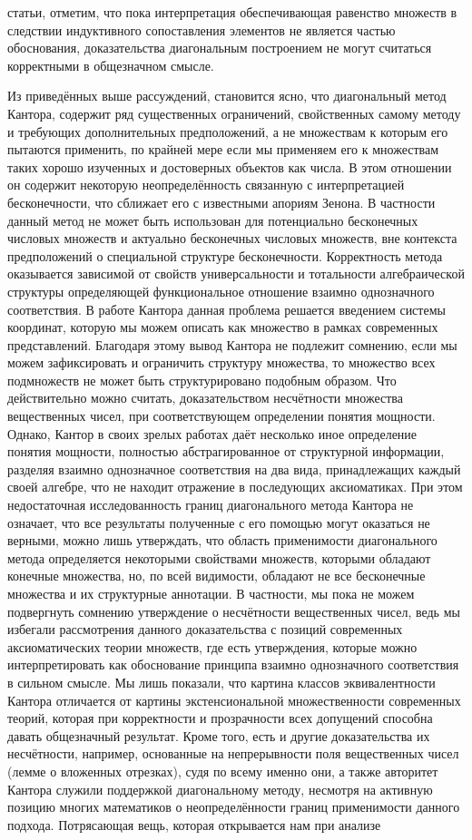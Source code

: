 \documentclass[12pt]{article}
\begin{document}
статьи, отметим, что пока интерпретация обеспечивающая равенство множеств в следствии индуктивного сопоставления элементов не является частью обоснования, доказательства диагональным построением не могут считаться корректными в общезначном смысле.

Из приведённых выше рассуждений, становится ясно, что диагональный метод Кантора, содержит ряд существенных ограничений, свойственных самому методу и требующих дополнительных предположений, а не множествам к которым его пытаются применить, по крайней мере если мы применяем его к множествам таких хорошо изученных и достоверных объектов как числа. В этом отношении он содержит некоторую неопределённость связанную с интерпретацией бесконечности, что сближает его с известными апориям Зенона. В частности данный метод не может быть использован для потенциально бесконечных числовых множеств и актуально бесконечных числовых множеств, вне контекста предположений о специальной структуре бесконечности. Корректность метода оказывается зависимой от свойств универсальности и тотальности алгебраической структуры определяющей функциональное отношение взаимно однозначного соответствия. В работе Кантора данная проблема решается введением системы координат, которую мы можем описать как множество в рамках современных представлений. Благодаря этому вывод Кантора не подлежит сомнению, если мы можем зафиксировать и ограничить структуру множества, то множество всех подмножеств не может быть структурировано подобным образом. Что действительно можно считать, доказательством несчётности множества вещественных чисел, при соответствующем определении понятия мощности. Однако, Кантор в своих зрелых работах даёт несколько иное определение понятия мощности, полностью абстрагированное от структурной информации, разделяя взаимно однозначное соответствия на два вида, принадлежащих каждый своей алгебре, что не находит отражение в последующих аксиоматиках. При этом недостаточная исследованность границ диагонального метода Кантора не означает, что все результаты полученные с его помощью могут оказаться не верными, можно лишь утверждать, что область применимости диагонального метода определяется некоторыми свойствами множеств, которыми обладают конечные множества, но, по всей видимости, обладают не все бесконечные множества и их структурные аннотации. В частности, мы пока не можем подвергнуть сомнению утверждение о несчётности вещественных чисел, ведь мы избегали рассмотрения данного доказательства с позиций современных аксиоматических теории множеств, где есть утверждения, которые можно интерпретировать как обоснование принципа взаимно однозначного соответствия в сильном смысле. Мы лишь показали, что картина классов эквивалентности Кантора отличается от картины экстенсиональной множественности современных теорий, которая при корректности и прозрачности всех допущений способна давать общезначный результат. Кроме того, есть и другие доказательства их несчётности, например, основанные на непрерывности поля вещественных чисел (лемме о вложенных отрезках), судя по всему именно они, а также авторитет Кантора служили поддержкой диагональному методу, несмотря на активную позицию многих математиков о неопределённости границ применимости данного подхода. Потрясающая вещь, которая открывается нам при анализе 
\end{document}
